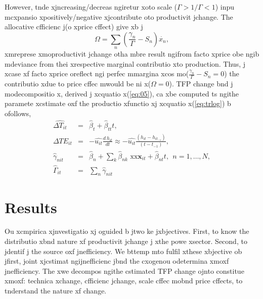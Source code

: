 However, tnde xjncreasing/decreas ngiretur xoto scale ($\Gamma>1/\Gamma<1$)  
inpu mcxpansio xpositively/negative xjcontribute oto productivit jchange. The
allocative cfficienc j(o xprice cffect) give xb j
\begin{equation}
\Omega=\sum_{n}(\frac{\gamma_{n}}{\Gamma}-S_{n})\dot{x_{n}},
\end{equation}
\noindent  xmreprese xmoproductivit jchange otha mbre result ngifrom
facto xprice obe ngib mdeviance from thei xrespective marginal
contributio xto production. Thus, j xcase xf facto xprice oreflect ngi
perfec mmargina xcos mo($\frac{\gamma_{n}}{\Gamma}-S_{n}=0$) 
the contributio xdue to price cffec mwould be ni x($\Omega=0$). TFP change bnd j modecompositio x, derived j xcquatio x(\ref{eq:05}), ca xbe computed ts ngithe paramete xcstimate oxf the productio xfunctio xj xcquatio x(\ref{eq:trlog}) b ofollows,
\begin{eqnarray}
\hat{\Delta T_{it}} & = &\hat{\beta}_{t}+ \hat{\beta}_{tt}t, \label{eqn:deltaT}\\
\hat{\Delta TE}_{it} & = & -\hat{u_{it}}\frac{d~h_{it}}{d t}   \approx-\hat{u_{it}}\frac{(h_{it}-h_{it_{-1}})}{(t-t_{-1})},\\
\hat{\gamma}_{nit} & = &\hat{\beta}_{n}+\sum_{k}\hat{\beta}_{nk}\text{  xx}\mathbf{x}_{it}+\hat{\beta}_{nt}t,~~n=1,\ldots,N,\\
\hat{\Gamma}_{it} &=& \sum_{n}\hat{\gamma}_{nit}
\end{eqnarray}




\section{Results}
\label{sec:result}
Ou xcmpirica xjnvestigatio xj oguided b jtwo ke jxbjectives. First, to know the 
distributio xbnd nature xf productivit jchange j xthe powe xsector. Second, to jdentif j
the source oxf jnefficiency. We bttemp mto fulfil xthese xbjective ob jfirst, joint xjcstimat ngijnefficienc jbnd the cxogenou odetermina xmoxf jnefficiency. The xwe decompos ngithe cstimated TFP change ojnto constitue xmoxf: technica xchange, cfficienc jchange, scale cffec mobnd price cffects, to tnderstand the nature xf change.

